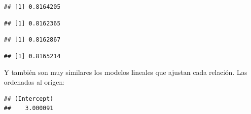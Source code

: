 \documentclass[]{book}
\newenvironment{Shaded}{\begin{snugshade}}{\end{snugshade}}
\newcommand{\DecValTok}[1]{\textcolor[rgb]{0.00,0.00,0.81}{#1}}
\newcommand{\KeywordTok}[1]{\textcolor[rgb]{0.13,0.29,0.53}{\textbf{#1}}}
\newcommand{\NormalTok}[1]{#1}
\newcommand{\OperatorTok}[1]{\textcolor[rgb]{0.81,0.36,0.00}{\textbf{#1}}}
\newcommand{\StringTok}[1]{\textcolor[rgb]{0.31,0.60,0.02}{#1}}
\begin{document}
\begin{verbatim}
## [1] 0.8164205
\end{verbatim}

\begin{Shaded}
\end{Shaded}

\begin{verbatim}
## [1] 0.8162365
\end{verbatim}

\begin{Shaded}
\end{Shaded}

\begin{verbatim}
## [1] 0.8162867
\end{verbatim}

\begin{Shaded}
\end{Shaded}

\begin{verbatim}
## [1] 0.8165214
\end{verbatim}

Y también son muy similares los modelos lineales que ajustan cada relación. Las ordenadas al origen:

\begin{Shaded}
\end{Shaded}

\begin{verbatim}
## (Intercept) 
##    3.000091
\end{verbatim}
\end{document}
